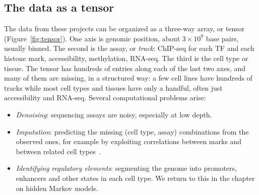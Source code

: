 \subsection{The data as a tensor}

The data from these projects can be organized as a three-way array, or tensor (Figure~\ref{fig:tensor}). One axis is genomic position, about $3\times10^9$ base pairs, usually binned. The second is the assay, or \emph{track}: ChIP-seq for each TF and each histone mark, accessibility, methylation, RNA-seq. The third is the cell type or tissue. The tensor has hundreds of entries along each of the last two axes, and many of them are missing, in a structured way: a few cell lines have hundreds of tracks while most cell types and tissues have only a handful, often just accessibility and RNA-seq. Several computational problems arise:
\begin{itemize}
  \item \emph{Denoising}: sequencing assays are noisy, especially at low depth.
  \item \emph{Imputation}: predicting the missing (cell type, assay) combinations from the observed ones, for example by exploiting correlations between marks and between related cell types~\citep{ernst2015}.
  \item \emph{Identifying regulatory elements}: segmenting the genome into promoters, enhancers and other states in each cell type. We return to this in the chapter on hidden Markov models.
\end{itemize}


